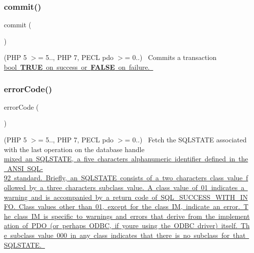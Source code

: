 \subsubsection{\texorpdfstring{commit()}{commit()}}
{\footnotesize\ttfamily commit (\begin{DoxyParamCaption}{ }\end{DoxyParamCaption})}

(P\+HP 5 $>$= 5.., P\+HP 7, P\+E\+CL pdo $>$= 0..)~\newline
 Commits a transaction \mbox{\hyperlink{}{bool {\bfseries T\+R\+UE} on success or {\bfseries F\+A\+L\+SE} on failure. }}\mbox{\label{interface_pes_1_1_database_1_1_handler_1_1_mini_1_1_p_d_o_interface_a928a98b280c4dd8971ce6998eb157409}} 
\subsubsection{\texorpdfstring{error\+Code()}{errorCode()}}
{\footnotesize\ttfamily error\+Code (\begin{DoxyParamCaption}{ }\end{DoxyParamCaption})}

(P\+HP 5 $>$= 5.., P\+HP 7, P\+E\+CL pdo $>$= 0..)~\newline
 Fetch the S\+Q\+L\+S\+T\+A\+TE associated with the last operation on the database handle \mbox{\hyperlink{}{mixed an S\+Q\+L\+S\+T\+A\+TE, a five characters alphanumeric identifier defined in the A\+N\+SI S\+Q\+L-\/92 standard. Briefly, an S\+Q\+L\+S\+T\+A\+TE consists of a two characters class value followed by a three characters subclass value. A class value of 01 indicates a warning and is accompanied by a return code of S\+Q\+L\+\_\+\+S\+U\+C\+C\+E\+S\+S\+\_\+\+W\+I\+T\+H\+\_\+\+I\+N\+FO. Class values other than \textquotesingle{}01\textquotesingle{}, except for the class \textquotesingle{}IM\textquotesingle{}, indicate an error. The class \textquotesingle{}IM\textquotesingle{} is specific to warnings and errors that derive from the implementation of P\+DO (or perhaps O\+D\+BC, if you\textquotesingle{}re using the O\+D\+BC driver) itself. The subclass value \textquotesingle{}000\textquotesingle{} in any class indicates that there is no subclass for that S\+Q\+L\+S\+T\+A\+TE. }} 


